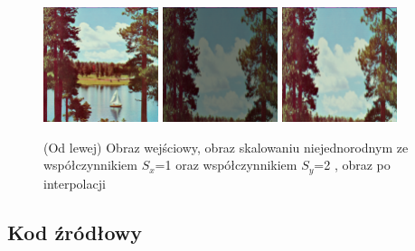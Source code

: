 \documentclass[final,a4paper,openany,12pt]{mwbk}
\begin{document}
\begin{figure}[H]
	\begin{center}
		\includegraphics[width=0.3\textwidth]{2/2Geo_ScaleNJ_Original}
		\includegraphics[width=0.3\textwidth]{2/2Geo_ScaleNJ_Result}
		\includegraphics[width=0.3\textwidth]{2/2Geo_ScaleNJ_Result_Interp}
	\end{center}
	\caption{(Od lewej) Obraz wejściowy, obraz skalowaniu niejednorodnym ze współczynnikiem $S_{x}$=1 oraz współczynnikiem $S_{y}$=2 , obraz po interpolacji }
\end{figure}

\subsection*{Kod źródłowy}
\end{document}
